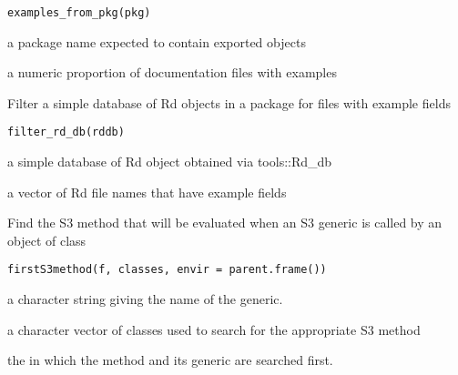 \documentclass[a4paper]{book}
\begin{document}
%
\begin{Usage}
\begin{verbatim}
examples_from_pkg(pkg)
\end{verbatim}
\end{Usage}
%
\begin{Arguments}
\begin{ldescription}
\item[\code{pkg}] a package name expected to contain exported objects
\end{ldescription}
\end{Arguments}
%
\begin{Value}
a numeric proportion of documentation files with examples
\end{Value}
%
\begin{Description}
Filter a simple database of Rd objects in a package for files with example fields
\end{Description}
%
\begin{Usage}
\begin{verbatim}
filter_rd_db(rddb)
\end{verbatim}
\end{Usage}
%
\begin{Arguments}
\begin{ldescription}
\item[\code{rddb}] a simple database of Rd object obtained via tools::Rd\_db
\end{ldescription}
\end{Arguments}
%
\begin{Value}
a vector of Rd file names that have example fields
\end{Value}
%
\begin{Description}
Find the S3 method that will be evaluated when an S3 generic is called by
an object of class 
\end{Description}
%
\begin{Usage}
\begin{verbatim}
firstS3method(f, classes, envir = parent.frame())
\end{verbatim}
\end{Usage}
%
\begin{Arguments}
\begin{ldescription}
\item[\code{f}] a character string giving the name of the generic.

\item[\code{classes}] a character vector of classes used to search for the
appropriate S3 method

\item[\code{envir}] the  in which the method and its
generic are searched first.
\end{ldescription}
\end{Arguments}
\end{document}
